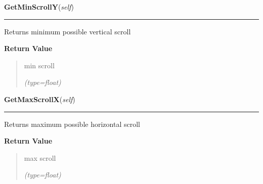     \vspace{0.5ex}

\hspace{.8\funcindent}\begin{boxedminipage}{\funcwidth}

    \raggedright \textbf{GetMinScrollY}(\textit{self})

    \vspace{-1.5ex}

    \rule{\textwidth}{0.5\fboxrule}
\setlength{\parskip}{2ex}
    Returns minimum possible vertical scroll

\setlength{\parskip}{1ex}
      \textbf{Return Value}
    \vspace{-1ex}

      \begin{quote}
      min scroll

      {\it (type=float)}

      \end{quote}

    \end{boxedminipage}

    \label{ImagePanel:ImagePanel:GetMaxScrollX}

    \vspace{0.5ex}

\hspace{.8\funcindent}\begin{boxedminipage}{\funcwidth}

    \raggedright \textbf{GetMaxScrollX}(\textit{self})

    \vspace{-1.5ex}

    \rule{\textwidth}{0.5\fboxrule}
\setlength{\parskip}{2ex}
    Returns maximum possible horizontal scroll

\setlength{\parskip}{1ex}
      \textbf{Return Value}
    \vspace{-1ex}

      \begin{quote}
      max scroll

      {\it (type=float)}

      \end{quote}

    \end{boxedminipage}

    \label{ImagePanel:ImagePanel:GetMaxScrollY}

